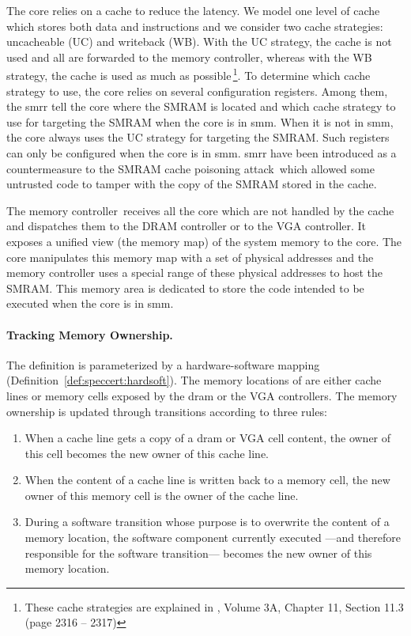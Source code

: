 The core relies on a cache to reduce the \IO latency.
%
We model one level of cache which stores both data and instructions and we
consider two cache strategies: uncacheable (UC) and writeback (WB).
%
With the UC strategy, the cache is not used and all \IOs are forwarded to the
memory controller, whereas with the WB strategy, the cache is used as much as
possible\,\footnote{These cache strategies are explained in
  \cite{intel2014manual}, Volume 3A, Chapter 11, Section 11.3 (page 2316 --
  2317)}.
%
To determine which cache strategy to use, the core relies on several
configuration registers.
%
Among them, the \ac{smrr} tell the core where the SMRAM is located and which
cache strategy to use for \IO targeting the SMRAM when the core is in \ac{smm}.
%
When it is not in \ac{smm}, the core always uses the UC strategy for \IO
targeting the SMRAM.
%
Such registers can only be configured when the core is in \ac{smm}.
%
\ac{smrr} have been introduced as a countermeasure to the SMRAM cache poisoning
attack\,\cite{wojtczuk2009smram,duflot2009smram} which allowed some untrusted
code to tamper with the copy of the SMRAM stored in the cache.
%

The memory controller\,\cite{intel2009mch} receives all the core \IOs which are
not handled by the cache and dispatches them to the DRAM controller or to the
VGA controller.
%
It exposes a unified view (the memory map) of the system memory to the core.
%
The core manipulates this memory map with a set of physical addresses and the
memory controller uses a special range of these physical addresses to host the
SMRAM.
%
This memory area is dedicated to store the code intended to be executed when the
core is in \ac{smm}.

\paragraph{Tracking Memory Ownership.}
%
The  definition is parameterized by a hardware-software
mapping  (Definition~\ref{def:speccert:hardsoft}).
%
The memory locations of  are either cache lines or memory
cells exposed by the \ac{dram} or the VGA controllers.
%
The memory ownership is updated through transitions according to three rules:
%
\begin{enumerate}
\item When a cache line gets a copy of a \ac{dram} or VGA cell content, the
  owner of this cell becomes the new owner of this cache line.
%
\item When the content of a cache line is written back to a memory cell, the
  new owner of this memory cell is the owner of the cache line.
%
\item During a software transition whose purpose is to overwrite the content of
  a memory location, the software component currently executed ---and therefore
  responsible for the software transition--- becomes the new owner of this
  memory location.
%
\end{enumerate}

